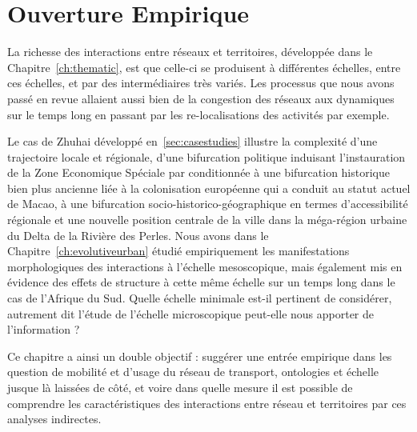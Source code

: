 




\chapter{Ouverture Empirique}

\label{ch:micro} %







La richesse des interactions entre réseaux et territoires, développée dans le Chapitre~\ref{ch:thematic}, est que celle-ci se produisent à différentes échelles, entre ces échelles, et par des intermédiaires très variés. Les processus que nous avons passé en revue allaient aussi bien de la congestion des réseaux aux dynamiques sur le temps long en passant par les re-localisations des activités par exemple.


Le cas de Zhuhai développé en~\ref{sec:casestudies} illustre la complexité d'une trajectoire locale et régionale, d'une bifurcation politique induisant l'instauration de la Zone Economique Spéciale par  conditionnée à une bifurcation historique bien plus ancienne liée à la colonisation européenne qui a conduit au statut actuel de Macao, à une bifurcation socio-historico-géographique en termes d'accessibilité régionale et une nouvelle position centrale de la ville dans la méga-région urbaine du Delta de la Rivière des Perles. Nous avons dans le Chapitre~\ref{ch:evolutiveurban} étudié empiriquement les manifestations morphologiques des interactions à l'échelle mesoscopique, mais également mis en évidence des effets de structure à cette même échelle sur un temps long dans le cas de l'Afrique du Sud. Quelle échelle minimale est-il pertinent de considérer, autrement dit l'étude de l'échelle microscopique peut-elle nous apporter de l'information ? 

Ce chapitre a ainsi un double objectif : suggérer une entrée empirique dans les question de mobilité et d'usage du réseau de transport, ontologies et échelle jusque là laissées de côté, et voire dans quelle mesure il est possible de comprendre les caractéristiques des interactions entre réseau et territoires par ces analyses indirectes.


